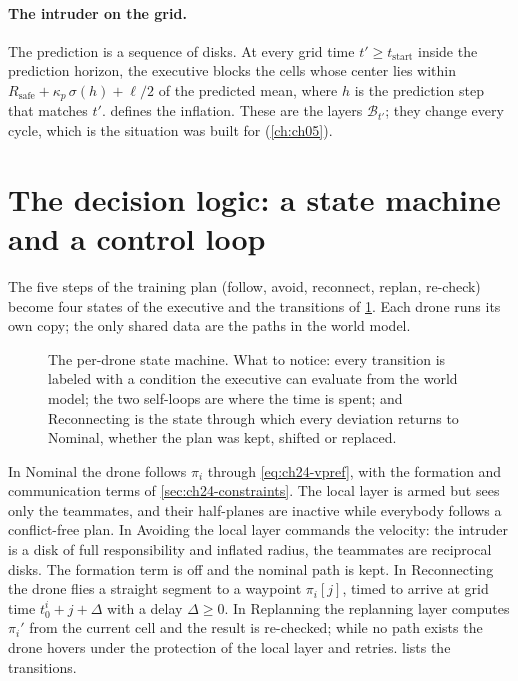 \paragraph{The intruder on the grid.}
The prediction is a sequence of disks. At every grid time $t' \ge
t_{\mathrm{start}}$ inside the prediction horizon, the executive blocks the
cells whose center lies within $R_{\mathrm{safe}} + \kappa_p\,\sigma(h) + \ell/2$
of the predicted mean, where $h$ is the prediction step that matches $t'$.
 defines the inflation. These are the layers
$\mathcal{B}_{t'}$; they change every cycle, which is the situation
\dstarlite was built for (\cref{ch:ch05}).

\section[The decision logic]{The decision logic: a state machine and a control loop}
\label{sec:ch24-logic}

The five steps of the training plan (follow, avoid, reconnect, replan,
re-check) become four states of the executive and the transitions of
\cref{fig:ch24-state-machine}. Each drone runs its own copy; the only shared
data are the paths in the world model.

\begin{figure}[tb]
  \centering
  \caption{The per-drone state machine. What to notice: every transition is
  labeled with a condition the executive can evaluate from the world model;
  the two self-loops are where the time is spent; and Reconnecting is the
  state through which every deviation returns to Nominal, whether the plan
  was kept, shifted or replaced.}
  \label{fig:ch24-state-machine}
\end{figure}

In Nominal the drone follows $\pi_i$ through \cref{eq:ch24-vpref}, with the
formation and communication terms of \cref{sec:ch24-constraints}. The local
layer is armed but sees only the teammates, and their half-planes are
inactive while everybody follows a conflict-free plan. In Avoiding the local
layer commands the velocity: the intruder is a disk of full responsibility
and inflated radius, the teammates are reciprocal disks. The formation term
is off and the nominal path is kept. In Reconnecting the drone flies a straight
segment to a waypoint $\pi_i[j]$, timed to arrive at grid time
$t_0^i + j + \Delta$ with a delay $\Delta \ge 0$. In Replanning the
replanning layer computes $\pi_i'$ from the current cell and the result is
re-checked; while no path exists the drone hovers under the protection of the
local layer and retries.  lists the transitions.


